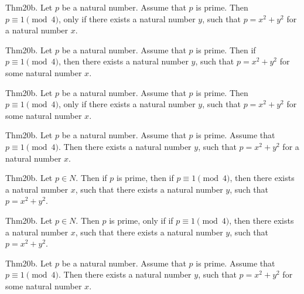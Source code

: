 \documentclass{article}
\begin{document}
Thm20b. Let $p$ be a natural number. Assume that $p$ is prime. Then $p \equiv 1 \pmod{ 4}$, only if there exists a natural number $y$, such that $p = x ^{ 2}+ y ^{ 2}$ for a natural number $x$.

Thm20b. Let $p$ be a natural number. Assume that $p$ is prime. Then if $p \equiv 1 \pmod{ 4}$, then there exists a natural number $y$, such that $p = x ^{ 2}+ y ^{ 2}$ for some natural number $x$.

Thm20b. Let $p$ be a natural number. Assume that $p$ is prime. Then $p \equiv 1 \pmod{ 4}$, only if there exists a natural number $y$, such that $p = x ^{ 2}+ y ^{ 2}$ for some natural number $x$.

Thm20b. Let $p$ be a natural number. Assume that $p$ is prime. Assume that $p \equiv 1 \pmod{ 4}$. Then there exists a natural number $y$, such that $p = x ^{ 2}+ y ^{ 2}$ for a natural number $x$.

Thm20b. Let $p \in N$. Then if $p$ is prime, then if $p \equiv 1 \pmod{ 4}$, then there exists a natural number $x$, such that there exists a natural number $y$, such that $p = x ^{ 2}+ y ^{ 2}$.

Thm20b. Let $p \in N$. Then $p$ is prime, only if if $p \equiv 1 \pmod{ 4}$, then there exists a natural number $x$, such that there exists a natural number $y$, such that $p = x ^{ 2}+ y ^{ 2}$.

Thm20b. Let $p$ be a natural number. Assume that $p$ is prime. Assume that $p \equiv 1 \pmod{ 4}$. Then there exists a natural number $y$, such that $p = x ^{ 2}+ y ^{ 2}$ for some natural number $x$.
\end{document}
